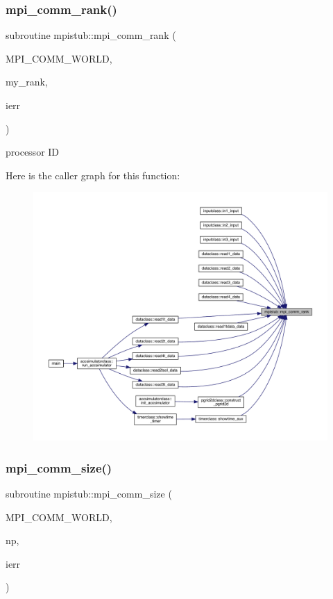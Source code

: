\subsubsection{\texorpdfstring{mpi\_comm\_rank()}{mpi\_comm\_rank()}}
{\footnotesize\ttfamily subroutine mpistub\+::mpi\+\_\+comm\+\_\+rank (\begin{DoxyParamCaption}\item[{}]{M\+P\+I\+\_\+\+C\+O\+M\+M\+\_\+\+W\+O\+R\+LD,  }\item[{}]{my\+\_\+rank,  }\item[{}]{ierr }\end{DoxyParamCaption})}



processor ID 

Here is the caller graph for this function\+:\nopagebreak
\begin{figure}[H]
\begin{center}
\leavevmode
\includegraphics[width=350pt]{namespacempistub_a3085e38e0e5d38df633afc7b2d92cebb_icgraph}
\end{center}
\end{figure}
\mbox{\label{namespacempistub_a188b67a76569dcb918a27f48018e6baf}} 
\subsubsection{\texorpdfstring{mpi\_comm\_size()}{mpi\_comm\_size()}}
{\footnotesize\ttfamily subroutine mpistub\+::mpi\+\_\+comm\+\_\+size (\begin{DoxyParamCaption}\item[{}]{M\+P\+I\+\_\+\+C\+O\+M\+M\+\_\+\+W\+O\+R\+LD,  }\item[{}]{np,  }\item[{}]{ierr }\end{DoxyParamCaption})}



